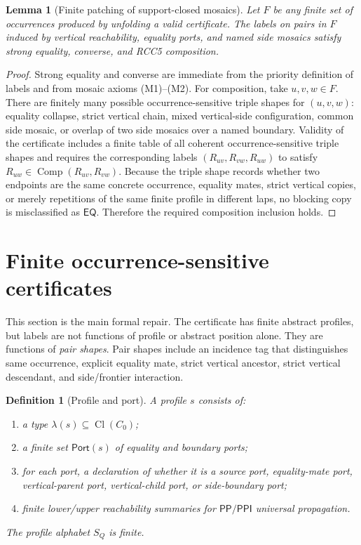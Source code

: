 \documentclass[11pt]{article}
\newtheorem{lemma}[theorem]{Lemma}
\newtheorem{definition}[theorem]{Definition}
\newcommand{\Cl}{\operatorname{Cl}}
\newcommand{\EQ}{\mathsf{EQ}}
\newcommand{\PP}{\mathsf{PP}}
\newcommand{\PPI}{\mathsf{PPI}}
\newcommand{\comp}{\operatorname{Comp}}
\newcommand{\Port}{\mathsf{Port}}
\begin{document}
\begin{lemma}[Finite patching of support-closed mosaics]\label{lem:patch}
Let \(F\) be any finite set of occurrences produced by unfolding a valid certificate.  The labels on pairs in \(F\) induced by vertical reachability, equality ports, and named side mosaics satisfy strong equality, converse, and RCC5 composition.
\end{lemma}

\begin{proof}
Strong equality and converse are immediate from the priority definition of labels and from mosaic axioms (M1)--(M2).  For composition, take \(u,v,w\in F\).  There are finitely many possible occurrence-sensitive triple shapes for \((u,v,w)\): equality collapse, strict vertical chain, mixed vertical-side configuration, common side mosaic, or overlap of two side mosaics over a named boundary.  Validity of the certificate includes a finite table of all coherent occurrence-sensitive triple shapes and requires the corresponding labels \((R_{uv},R_{vw},R_{uw})\) to satisfy \(R_{uw}\in\comp(R_{uv},R_{vw})\).  Because the triple shape records whether two endpoints are the same concrete occurrence, equality mates, strict vertical copies, or merely repetitions of the same finite profile in different laps, no blocking copy is misclassified as \(\EQ\).  Therefore the required composition inclusion holds.
\end{proof}

\section{Finite occurrence-sensitive certificates}

This section is the main formal repair.  The certificate has finite abstract profiles, but labels are not functions of profile or abstract position alone.  They are functions of \emph{pair shapes}.  Pair shapes include an incidence tag that distinguishes same occurrence, explicit equality mate, strict vertical ancestor, strict vertical descendant, and side/frontier interaction.

\begin{definition}[Profile and port]
A profile \(s\) consists of:
\begin{enumerate}[label=(P\arabic*)]
\item a type \(\lambda(s)\subseteq\Cl(C_0)\);
\item a finite set \(\Port(s)\) of equality and boundary ports;
\item for each port, a declaration of whether it is a source port, equality-mate port, vertical-parent port, vertical-child port, or side-boundary port;
\item finite lower/upper reachability summaries for \(\PP/\PPI\) universal propagation.
\end{enumerate}
The profile alphabet \(S_Q\) is finite.
\end{definition}
\end{document}
